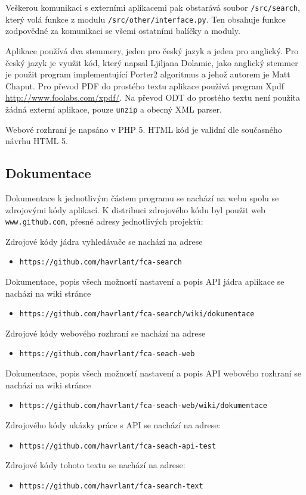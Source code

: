 \documentclass[12pt]{article}
\newcommand{\code}[1]{\texttt{#1}}
\newcommand{\ssection}[1]{\subsection{#1}}
\begin{document}
Veškerou komunikaci s externími aplikacemi pak obstarává soubor \code{/src/search}, který volá funkce z modulu \code{/src/other/interface.py}. Ten obsahuje funkce zodpovědné za komunikaci se všemi ostatními balíčky a moduly. 

Aplikace používá dva stemmery, jeden pro český jazyk a jeden pro anglický. Pro český jazyk je využit kód, který napsal Ljiljana Dolamic, jako anglický stemmer je použit program implementující Porter2 algoritmus a jehož autorem je Matt Chaput. Pro převod PDF do prostého textu aplikace používá program Xpdf \url{http://www.foolabs.com/xpdf/}. Na převod ODT do prostého textu není použita žádná externí aplikace, pouze \code{unzip} a obecný XML parser. 

Webové rozhraní je napsáno v PHP 5. HTML kód je validní dle současného návrhu HTML 5. 

\ssection{Dokumentace}\label{ch.dokumentace}
Dokumentace k jednotlivým částem programu se nachází na webu spolu se zdrojovými kódy aplikací. K distribuci zdrojového kódu byl použit web \code{www.github.com}, přesné adresy jednotlivých projektů: 

Zdrojové kódy jádra vyhledávače se nachází na adrese
\begin{itemize}
	\item \code{https://github.com/havrlant/fca-search}
\end{itemize}
Dokumentace, popis všech možností nastavení a popis API jádra aplikace se nachází na wiki stránce
\begin{itemize}
	\item \code{https://github.com/havrlant/fca-search/wiki/dokumentace}
\end{itemize}
Zdrojové kódy webového rozhraní se nachází na adrese
\begin{itemize}
	\item \code{https://github.com/havrlant/fca-seach-web}
\end{itemize}
Dokumentace, popis všech možností nastavení a popis API webového rozhraní se nachází na wiki stránce
\begin{itemize}
	\item \code{https://github.com/havrlant/fca-seach-web/wiki/dokumentace}
\end{itemize}
Zdrojového kódy ukázky práce s API se nachází na adrese:
\begin{itemize}
	\item \code{https://github.com/havrlant/fca-seach-api-test}
\end{itemize}
Zdrojové kódy tohoto textu se nachází na adrese:
\begin{itemize}
	\item \code{https://github.com/havrlant/fca-search-text}
\end{itemize}
\end{document}
